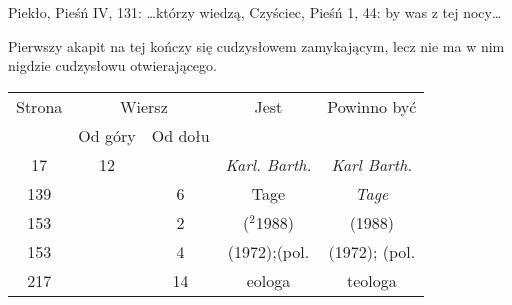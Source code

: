 \documentclass[a4paper,11pt]{article}
\begin{document}
Piekło, Pieśń IV, 131: \ldots którzy wiedzą, Czyściec, Pieśń 1, 44: by was
z tej nocy\ldots












\newpage


\vspace{0em}



\vspace{0em}


\noindent
{} Pierwszy akapit na tej kończy się cudzysłowem zamykającym, lecz
nie ma w nim nigdzie cudzysłowu otwierającego.

\vspace{\spaceFour}







\begin{center}

  \begin{tabular}{|c|c|c|c|c|}
    \hline
    Strona & \multicolumn{2}{c|}{Wiersz} & Jest
                              & Powinno być \\ \cline{2-3}
    & Od góry & Od dołu & & \\
    \hline
    \hphantom{0}17 & 12 & & \textit{Karl. Barth.} & \textit{Karl Barth.} \\
    139 & & \hphantom{0}6 & Tage & \textit{Tage} \\
    153 & & \hphantom{0}2 & ($^{ 2 }$1988) & (1988) \\
    153 & & \hphantom{0}4 & (1972);(pol. & (1972); (pol. \\
    217 & & 14 & eologa & teologa \\
    \hline
  \end{tabular}

\end{center}
\end{document}
